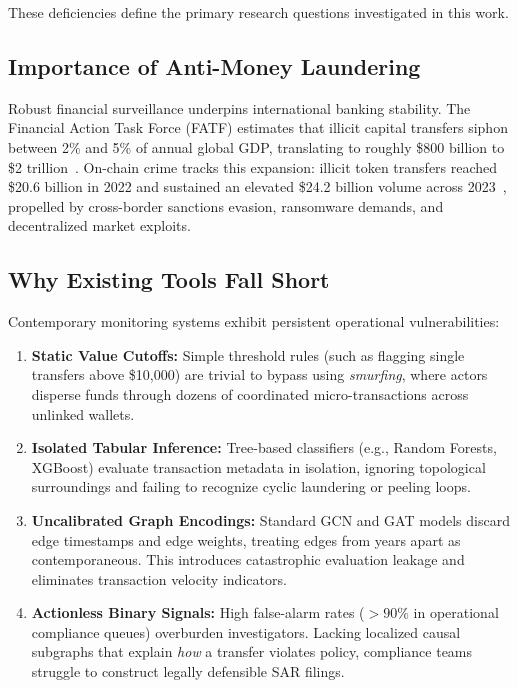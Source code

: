 These deficiencies define the primary research questions investigated in this work.

\subsection{Importance of Anti-Money Laundering}
\label{subsec:importance_aml}

Robust financial surveillance underpins international banking stability. The Financial Action Task Force (FATF) estimates that illicit capital transfers siphon between 2\% and 5\% of annual global GDP, translating to roughly \$800 billion to \$2 trillion~\cite{fatf2022}. On-chain crime tracks this expansion: illicit token transfers reached \$20.6 billion in 2022 and sustained an elevated \$24.2 billion volume across 2023~\cite{chainalysis2023}, propelled by cross-border sanctions evasion, ransomware demands, and decentralized market exploits.

\subsection{Why Existing Tools Fall Short}
\label{subsec:shortcomings}

Contemporary monitoring systems exhibit persistent operational vulnerabilities:
\begin{enumerate}
    \item \textbf{Static Value Cutoffs:} Simple threshold rules (such as flagging single transfers above \$10,000) are trivial to bypass using \textit{smurfing}, where actors disperse funds through dozens of coordinated micro-transactions across unlinked wallets.
    \item \textbf{Isolated Tabular Inference:} Tree-based classifiers (e.g., Random Forests, XGBoost) evaluate transaction metadata in isolation, ignoring topological surroundings and failing to recognize cyclic laundering or peeling loops.
    \item \textbf{Uncalibrated Graph Encodings:} Standard GCN and GAT models discard edge timestamps and edge weights, treating edges from years apart as contemporaneous. This introduces catastrophic evaluation leakage and eliminates transaction velocity indicators.
    \item \textbf{Actionless Binary Signals:} High false-alarm rates ($>90\%$ in operational compliance queues) overburden investigators. Lacking localized causal subgraphs that explain \textit{how} a transfer violates policy, compliance teams struggle to construct legally defensible SAR filings.
\end{enumerate}

